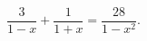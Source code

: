 \begin{ex}[type=equation]
	\begin{condition}
		$\dfrac{3}{1-x} + \dfrac{1}{1+x} = \dfrac{28}{1-x^2}.$
	\end{condition}
\end{ex}